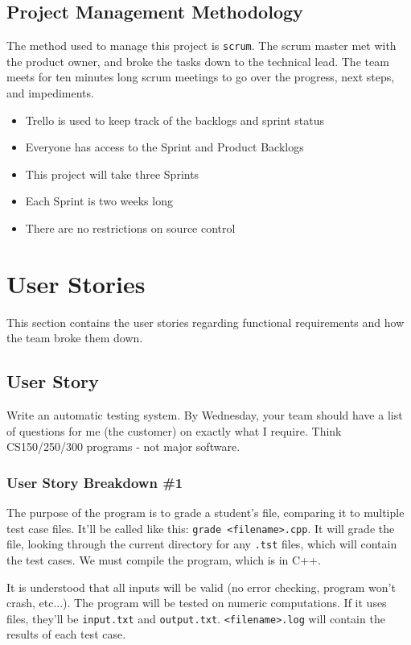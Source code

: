 \subsection{Project  Management Methodology}
The method used to manage this project is {\tt scrum}. The scrum master met with the product owner, and broke the tasks down to the technical lead. The team meets for ten minutes long scrum meetings to go over the progress, next steps, and impediments. 
 
\begin{itemize}
\item Trello is used to keep track of the backlogs and sprint status
\item Everyone has access to the Sprint and Product Backlogs
\item This project will take three Sprints
\item Each Sprint is two weeks long
\item There are no restrictions on source control 
\end{itemize}

\section{User Stories}
This section contains the user stories regarding functional requirements and how the team broke them down.




\subsection{User Story}
Write an automatic testing system. By Wednesday, your team should have a list of questions for me (the customer) on exactly what I require. Think CS150/250/300 programs - not major software.

\subsubsection{User Story Breakdown \#1}

The purpose of the program is to grade a student's file, comparing it to multiple test case files. It'll be called like this: {\tt grade <filename>.cpp}. It will grade the file, looking through the current directory for any {\tt .tst} files, which will contain the test cases. We must compile the program, which is in C++. 

It is understood that all inputs will be valid (no error checking, program won't crash, etc...). The program will be tested on numeric computations. If it uses files, they'll be {\tt input.txt} and {\tt output.txt}. {\tt <filename>.log} will contain the results of each test case.

